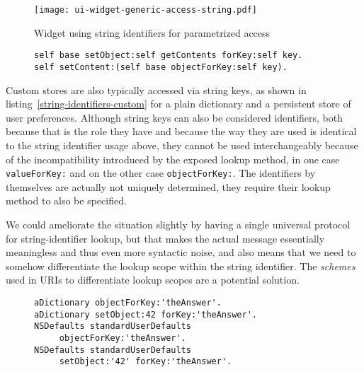 \documentclass[preprint,authoryear]{llncs}
\begin{document}
\begin{figure}[htbp]
\begin{center}
\texttt{[image: ui-widget-generic-access-string.pdf]}
\caption{Widget using string identifiers for parametrized access}
\label{ui-widget-string-access}
\end{center}
\end{figure}

\begin{figure}[htbp]
\begin{lstlisting}[style=numbers,label=kvc-variable-string,caption=Parametrized access via KVC.]
self base setObject:self getContents forKey:self key.
self setContent:(self base objectForKey:self key).
\end{lstlisting}
\end{figure}

Custom stores are also typically accessed via string keys, as shown in listing~\ref{string-identifiers-custom} for
a plain dictionary and a persistent store of user preferences.  Although string keys can also be considered 
identifiers, both because that is the role they have and because the way they are used is identical to
the string identifier usage above, they cannot be used interchangeably because of the incompatibility
introduced by the exposed lookup method, in one case {\tt valueForKey:} and on the other case {\tt objectForKey:}.
The identifiers by themselves are actually not uniquely determined, they require their lookup method to also
be specified.


We could ameliorate the situation slightly by having a single universal protocol
for string-identifier lookup, but that makes the actual message essentially
meaningless and thus even more syntactic noise, and also means that we need
to somehow differentiate the lookup scope within the string identifier.   The
\emph{schemes} used in URIs to differentiate lookup scopes are a potential
solution.


\begin{figure}[htbp]
\begin{lstlisting}[style=numbers,label=string-identifiers-custom,caption=String-based identifiers for custom storage.]
aDictionary objectForKey:'theAnswer'.
aDictionary setObject:42 forKey:'theAnswer'.
NSDefaults standardUserDefaults
	 objectForKey:'theAnswer'.
NSDefaults standardUserDefaults
	 setObject:'42' forKey:'theAnswer'.
\end{lstlisting}
\end{figure}
\end{document}
